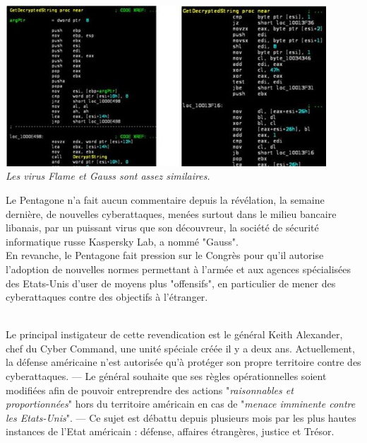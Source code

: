 \documentclass[11pt,twoside,a4paper]{article}
\begin{document}
\begin{minipage}[ht]{12.25cm}
	\includegraphics[width=12.00cm]{img/1744629_3_8bd2_les-virus-flame-et-gauss-sont-assez-similaires_6da5f9190191e99b3ac718154775b7f0.jpg}
	~\\ \emph{\centering Les virus Flame et Gauss sont assez similaires. }
\end{minipage} \hfill \begin{minipage}[ht]{6.50cm}
	\small
	Le Pentagone n'a fait aucun commentaire depuis la r{\'e}v{\'e}lation, la semaine derni{\`e}re, de nouvelles cyberattaques, men{\'e}es surtout dans le milieu bancaire libanais, par un puissant virus que son d{\'e}couvreur, la soci{\'e}t{\'e} de s{\'e}curit{\'e} informatique russe Kaspersky Lab, a nomm{\'e} "Gauss".~\\
	
	En revanche, le Pentagone fait pression sur le Congr{\`e}s pour qu'il autorise l'adoption de nouvelles normes permettant {\`a} l'arm{\'e}e et aux agences sp{\'e}cialis{\'e}es des Etats-Unis d'user de moyens plus "offensifs", en particulier de mener des cyberattaques contre des objectifs {\`a} l'{\'e}tranger.~\\
\end{minipage}~\\

Le principal instigateur de cette revendication est le g{\'e}n{\'e}ral Keith Alexander, chef du Cyber Command, une unit{\'e} sp{\'e}ciale cr{\'e}{\'e}e il y a deux ans. Actuellement, la d{\'e}fense am{\'e}ricaine n'est autoris{\'e}e qu'{\`a} prot{\'e}ger son propre territoire contre des cyberattaques. --- Le g{\'e}n{\'e}ral souhaite que ses r{\`e}gles op{\'e}rationnelles soient modifi{\'e}es afin de pouvoir entreprendre des actions "\emph{raisonnables et proportionn{\'e}es}" hors du territoire am{\'e}ricain en cas de "\emph{menace imminente contre les Etats-Unis}". --- Ce sujet est d{\'e}battu depuis plusieurs mois par les plus hautes instances de l'Etat am{\'e}ricain : d{\'e}fense, affaires {\'e}trang{\`e}res, justice et Tr{\'e}sor.~\\
\end{document}
